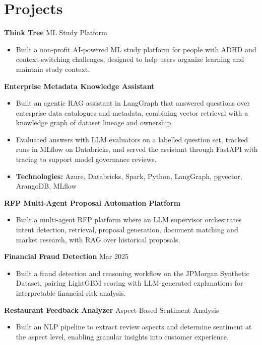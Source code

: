\documentclass[10pt,a4paper]{article}
\begin{document}
\section{Projects}
\textbf{Think Tree} \textbar{} ML Study Platform\par
\begin{itemize}
  \item Built a non-profit AI-powered ML study platform for people with ADHD and context-switching challenges, designed to help users organize learning and maintain study context.
\end{itemize}
\textbf{Enterprise Metadata Knowledge Assistant}\par
\begin{itemize}
  \item Built an agentic RAG assistant in LangGraph that answered questions over enterprise data catalogues and metadata, combining vector retrieval with a knowledge graph of dataset lineage and ownership.
  \item Evaluated answers with LLM evaluators on a labelled question set, tracked runs in MLflow on Databricks, and served the assistant through FastAPI with tracing to support model governance reviews.
  \item \textbf{Technologies:} Azure, Databricks, Spark, Python, LangGraph, pgvector, ArangoDB, MLflow
\end{itemize}
\textbf{RFP Multi-Agent Proposal Automation Platform}\par
\begin{itemize}
  \item Built a multi-agent RFP platform where an LLM supervisor orchestrates intent detection, retrieval, proposal generation, document matching and market research, with RAG over historical proposals.
\end{itemize}
\textbf{Financial Fraud Detection} \textbar{} Mar 2025\par
\begin{itemize}
  \item Built a fraud detection and reasoning workflow on the JPMorgan Synthetic Dataset, pairing LightGBM scoring with LLM-generated explanations for interpretable financial-risk analysis.
\end{itemize}
\textbf{Restaurant Feedback Analyzer} \textbar{} Aspect-Based Sentiment Analysis\par
\begin{itemize}
  \item Built an NLP pipeline to extract review aspects and determine sentiment at the aspect level, enabling granular insights into customer experience.
\end{itemize}
\end{document}
